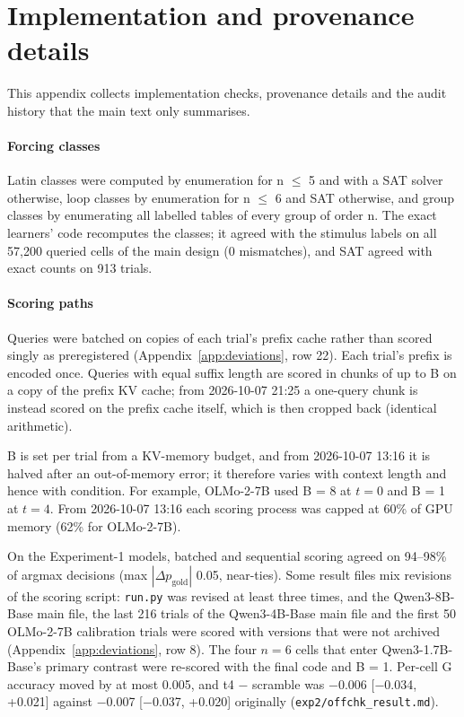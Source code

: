 \documentclass[11pt]{article}
\begin{document}
\section{Implementation and provenance details}\label{app:impl}

This appendix collects implementation checks, provenance details and the audit history that the main text only summarises.

\paragraph{Forcing classes}

Latin classes were computed by enumeration for n $\leq$ 5 and with a SAT solver~\cite{ignatiev2018pysat} otherwise, loop classes by enumeration for n $\leq$ 6 and SAT otherwise, and group classes by enumerating all labelled tables of every group of order n. The exact learners' code recomputes the classes; it agreed with the stimulus labels on all 57,200 queried cells of the main design (0 mismatches), and SAT agreed with exact counts on 913 trials.

\paragraph{Scoring paths}

Queries were batched on copies of each trial's prefix cache rather than scored singly as preregistered (Appendix~\ref{app:deviations}, row 22). Each trial's prefix is encoded once. Queries with equal suffix length are scored in chunks of up to B on a copy of the prefix KV cache; from 2026-10-07 21:25 a one-query chunk is instead scored on the prefix cache itself, which is then cropped back (identical arithmetic).

B is set per trial from a KV-memory budget, and from 2026-10-07 13:16 it is halved after an out-of-memory error; it therefore varies with context length and hence with condition. For example, OLMo-2-7B used B = 8 at $t = 0$ and B = 1 at $t = 4$. From 2026-10-07 13:16 each scoring process was capped at 60\% of GPU memory (62\% for OLMo-2-7B).

On the Experiment-1 models, batched and sequential scoring agreed on 94--98\% of argmax decisions (max $|\Delta p_{\mathrm{gold}}|$ 0.05, near-ties). Some result files mix revisions of the scoring script: \texttt{run.py} was revised at least three times, and the Qwen3-8B-Base main file, the last 216 trials of the Qwen3-4B-Base main file and the first 50 OLMo-2-7B calibration trials were scored with versions that were not archived (Appendix~\ref{app:deviations}, row 8). The four $n = 6$ cells that enter Qwen3-1.7B-Base's primary contrast were re-scored with the final code and B = 1. Per-cell G accuracy moved by at most 0.005, and t4 $-$ scramble was $-$0.006 [$-$0.034, +0.021] against $-$0.007 [$-$0.037, +0.020] originally (\texttt{exp2/\allowbreak{}offchk\_result.md}).
\end{document}
